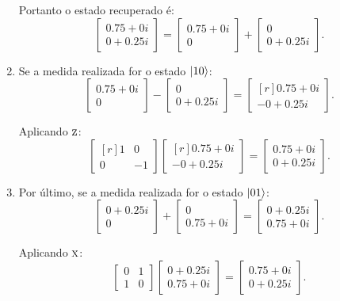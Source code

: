 \begin{enumerate}
        Portanto o estado recuperado é:
        \[
        \begin{bmatrix} {0.75+0i} \\ {0+0.25i} \end{bmatrix} = \begin{bmatrix} {0.75+0i} \\ 0 \end{bmatrix} +  \begin{bmatrix} 0 \\ {0+0.25i} \end{bmatrix}.
        \]

  \item Se a medida realizada for o estado $\ket{10}$:
        \[
        \begin{bmatrix} {0.75+0i} \\ 0 \end{bmatrix} - \begin{bmatrix} 0 \\ {0+0.25i} \end{bmatrix} = \begin{bmatrix*}[r] {0.75+0i} \\ -{0+0.25i} \end{bmatrix*}.
        \]

        Aplicando \(\operatorname{\textsc{z}}\):
        \[
        \begin{bmatrix*}[r] 1 & 0 \\ 0 & -1 \end{bmatrix*}\begin{bmatrix*}[r] {0.75+0i} \\ -{0+0.25i} \end{bmatrix*} = \begin{bmatrix} {0.75+0i} \\ {0+0.25i} \end{bmatrix}.
        \]

  \item Por último, se a medida realizada for o estado $\ket{01}$:
        \[
        \begin{bmatrix} {0+0.25i} \\ 0 \end{bmatrix} +  \begin{bmatrix} 0 \\ {0.75+0i} \end{bmatrix} = \begin{bmatrix} {0+0.25i} \\ {0.75+0i} \end{bmatrix}.
        \]

        Aplicando \(\operatorname{\textsc{x}}\):
        \[
        \begin{bmatrix} 0 & 1 \\ 1 & 0 \end{bmatrix} \begin{bmatrix} {0+0.25i} \\ {0.75+0i} \end{bmatrix} = \begin{bmatrix} {0.75+0i} \\ {0+0.25i} \end{bmatrix}.
        \]
\end{enumerate}

